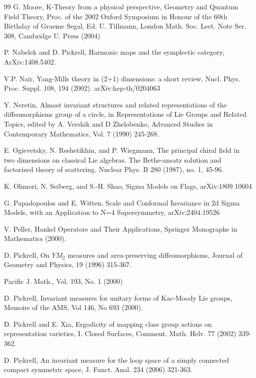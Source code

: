 \documentclass{amsart}
\theoremstyle{conjecture}
\theoremstyle{definition}
\theoremstyle{question}
\theoremstyle{questions}
\theoremstyle{remark}
\theoremstyle{remarks}
\theoremstyle{example}
\numberwithin{equation}{section}
\begin{document}
\begin{thebibliography}{99}
 G. Moore, K-Theory from a physical perspective, Geometry and Quantum Field Theory, Proc. of the 2002 Oxford
Symposium in Honour of the 60th Birthday of Graeme Segal, Ed. U. Tillmann,
London Math. Soc. Lect. Note Ser. 308, Cambridge U. Press (2004)


 P. Nabelek and D. Pickrell, Harmonic maps and the symplectic category, ArXiv:1408.5402.


 V.P. Nair, Yang-Mills theory in (2+1) dimensions: a short
review, Nucl. Phys. Proc. Suppl. 108, 194 (2002).
arXiv:hep-th/0204063

 Y.  Neretin, Almost invariant structures and
related representations of the diffeomorphisms group of
a circle, in Representations of Lie Groups and Related
Topics, edited by A.  Vershik and D Zhelobenko, Advanced
Studies in Contemporary Mathematics, Vol.  7 (1990)
245-268.

E. Ogievetsky, N. Reshetikhin, and P. Wiegmann, The principal chiral field in two
dimensions on classical Lie algebras. The Bethe-ansatz solution and factorized theory of
scattering. Nuclear Phys. B 280 (1987), no. 1, 45-96.

 K. Ohmori, N. Seiberg, and S.-H. Shao, Sigma Models on Flags,
arXiv:1809.10604

 G. Papadopoulos and E. Witten, Scale and Conformal Invariance in 2d Sigma Models,
with an Application to N=4 Supersymmetry, arXiv:2404.19526

 V. Peller, Hankel Operators and Their Applications, Springer Monographs in Mathematics (2000).

D. Pickrell, On $YM_2$ measures and area-preserving diffeomorphisms, Journal of Geometry and Physics, 19 (1996) 315-367.

Pacific J. Math., Vol. 193, No. 1 (2000)

D. Pickrell, Invariant measures for unitary forms of
Kac-Moody Lie groups, Memoirs of the AMS, Vol 146, No 693 (2000).

 D. Pickrell and E. Xia, Ergodicity of mapping class group actions on
representation varieties, I. Closed Surfaces, Comment. Math. Helv. 77 (2002) 339-362.

D. Pickrell, An invariant measure for the loop
space of a simply connected compact symmetric space, J. Funct.
Anal. 234 (2006) 321-363.


\end{thebibliography}
\end{document}
